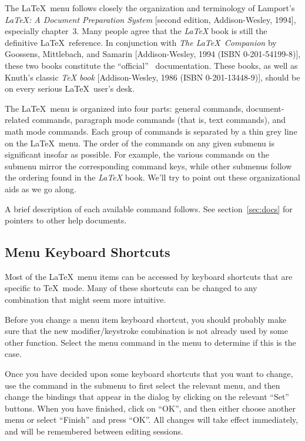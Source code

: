 \documentclass{report}
\begin{document}
The \LaTeX\ menu follows closely the organization and terminology of 
Lamport's \textsl{\LaTeX: A Document Preparation System} [second 
edition, Addison-Wesley, 1994], especially chapter~3.  Many people 
agree that the \textsl{\LaTeX} book is still the definitive \LaTeX\ 
reference.  In conjunction with \textsl{The \LaTeX\ Companion} by 
Goossens, Mittlebach, and Samarin [Addison-Wesley, 1994 (ISBN 
0-201-54199-8)], these two books constitute the ``official'' \LaTeXe\ 
documentation.  These books, as well as Knuth's classic \textsl{\TeX 
book} [Addison-Wesley, 1986 (ISBN 0-201-13448-9)], should be on every 
serious \LaTeX\ user's desk.

The \LaTeX\ menu is organized into four parts: general commands, 
document-related commands, paragraph mode commands (that is, text 
commands), and math mode commands.  Each group of commands is 
separated by a thin grey line on the \LaTeX\ menu.  The order of the 
commands on any given submenu is significant insofar as possible.  For 
example, the various commands on the \amenu{Environments} submenu 
mirror the corresponding command keys, while other submenus follow the 
ordering found in the \textsl{\LaTeX} book.  We'll try to point out 
these organizational aids as we go along.

A brief description of each available command follows.  See  
section~\ref{sec:docs} for pointers to other help documents.

\subsection{Menu Keyboard Shortcuts}

Most of the \LaTeX\ menu items can be accessed by keyboard shortcuts that are
specific to \TeX\ mode.  Many of these shortcuts can be changed to any
combination that might seem more intuitive.  

Before you change a menu item keyboard shortcut, you should probably make sure
that the new modifier/keystroke combination is not already used by some other
function.  Select the \acmd{Describe Binding} menu command in the
\amenu{Config} menu to determine if this is the case.

Once you have decided upon some keyboard shortcuts that you want to change,
use the  command in the  submenu
to first select the relevant menu, and then change the bindings that appear in
the dialog by clicking on the relevant ``Set'' buttons.  When you have
finished, click on ``OK'', and then either choose another menu or select
``Finish'' and press ``OK''.  All changes will take effect immediately, and
will be remembered between editing sessions.
\end{document}
